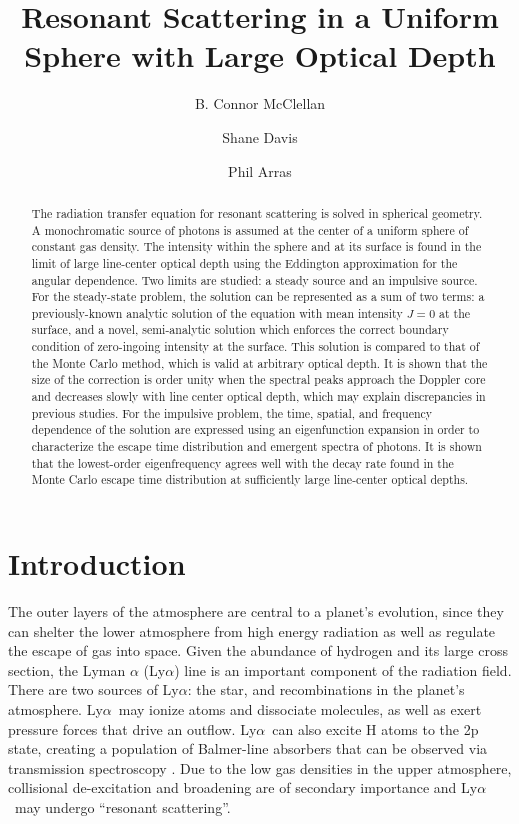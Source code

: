 \documentclass[linenumbers]{aastex63}
\newcommand\lya{Ly$\alpha$\ }
\begin{document}
\title{Resonant Scattering in a Uniform Sphere with Large Optical Depth}


\author[0000-0002-6040-8281]{B. Connor McClellan}
\author[0000-0001-7488-4468]{Shane Davis}
\author[0000-0001-5611-1349]{Phil Arras}
\address{Department of Astronomy, University of Virginia, Charlottesville, VA 22904, USA}

\begin{abstract}
The radiation transfer equation for resonant scattering is solved in spherical geometry. A monochromatic source of photons is assumed at the center of a uniform sphere of constant gas density. The intensity within the sphere and at its surface is found in the limit of large line-center optical depth using the Eddington approximation for the angular dependence. Two limits are studied: a steady source and an impulsive source. For the steady-state problem, the solution can be represented as a sum of two terms: a previously-known analytic solution of the equation with  mean intensity $J=0$ at the surface, and a novel, semi-analytic solution which enforces the correct boundary condition of zero-ingoing intensity at the surface. This solution is compared to that of the Monte Carlo method, which is valid at arbitrary optical depth. It is shown that the size of the correction is order unity when the spectral peaks approach the Doppler core and decreases slowly with line center optical depth, which may explain discrepancies in previous studies. For the impulsive problem, the time, spatial, and frequency dependence of the solution are expressed using an eigenfunction expansion in order to characterize the escape time distribution and emergent spectra of photons. It is shown that the lowest-order eigenfrequency agrees well with the decay rate found in the Monte Carlo escape time distribution at sufficiently large line-center optical depths.

\end{abstract}


\keywords{}

\section{Introduction}
\label{sec:intro}

The outer layers of the atmosphere are central to a planet's evolution, since they can shelter the lower atmosphere from high energy radiation as well as regulate the escape of gas into space. Given the abundance of hydrogen and its large cross section, the Lyman $\alpha$ (Ly$\alpha$) line is an important component of the radiation field. There are two sources of Ly$\alpha$: the star, and recombinations in the planet's atmosphere. \lya may ionize atoms and dissociate molecules, as well as exert pressure forces that drive an outflow. \lya can also excite H atoms to the 2p state, creating a population of Balmer-line absorbers that can be observed via transmission spectroscopy \citep{2017ApJ...851..150H}. Due to the low gas densities in the upper atmosphere, collisional de-excitation and broadening are of secondary importance and \lya may undergo ``resonant scattering''.
\end{document}
